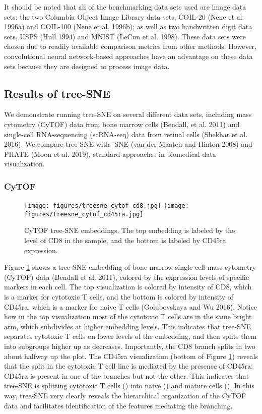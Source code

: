 \documentclass{article}
\begin{document}
It should be noted that all of the benchmarking data sets used are image data sets: the two Columbia Object Image Library data sets, COIL-20 (Nene et al. 1996a) and COIL-100 (Nene et al. 1996b); as well as two handwritten digit data sets, USPS (Hull 1994) and MNIST (LeCun et al. 1998). These data sets were chosen due to readily available comparison metrics from other methods. However, convolutional neural network-based approaches have an advantage on these data sets because they are designed to process image data.

\subsection{Results of tree-SNE}

We demonstrate running tree-SNE on several different data sets, including mass cytometry (CyTOF) data from bone marrow cells (Bendall, et al. 2011) and single-cell RNA-sequencing (scRNA-seq) data from retinal cells (Shekhar et al. 2016). We compare tree-SNE with -SNE (van der Maaten and Hinton 2008) and PHATE (Moon et al. 2019), standard approaches in biomedical data visualization.

\subsubsection{CyTOF}

\begin{figure}[htp]
    \centering
    \captionsetup{width=.9\linewidth}
    \texttt{[image: figures/treesne\_cytof\_cd8.jpg]}
    \texttt{[image: figures/treesne\_cytof\_cd45ra.jpg]}
    \caption{CyTOF tree-SNE embeddings. The top embedding is labeled by the level of CD8 in the sample, and the bottom is labeled by CD45ra expression.}
    \label{fig:CyTOF-tree-SNE}
\end{figure}

Figure \ref{fig:CyTOF-tree-SNE} shows a tree-SNE embedding of bone marrow single-cell mass cytometry (CyTOF) data (Bendall et al. 2011), colored by the expression levels of specific markers in each cell. The top visualization is colored by intensity of CD8, which is a marker for cytotoxic T cells, and the bottom is colored by intensity of CD45ra, which is a marker for naive T cells (Golubovskaya and Wu 2016). Notice how in the top visualization most of the cytotoxic T cells are in the same bright arm, which subdivides at higher embedding levels. This indicates that tree-SNE separates cytotoxic T cells on lower levels of the embedding, and then splits them into subgroups higher up as  decreases. Importantly, the CD8 branch splits in two about halfway up the plot. The CD45ra visualization (bottom of Figure \ref{fig:CyTOF-tree-SNE}) reveals that the split in the cytotoxic T cell line is mediated by the presence of CD45ra: CD45ra is present in one of the branches but not the other. This indicates that tree-SNE is splitting cytotoxic T cells () into naive () and mature cells (). In this way, tree-SNE very clearly reveals the hierarchical organization of the CyTOF data and facilitates identification of the features mediating the branching. 
\end{document}
